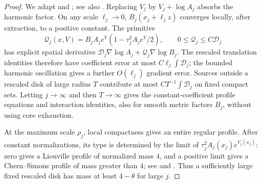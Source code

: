 \documentclass[11pt,reqno]{amsart}
\numberwithin{equation}{section}
\theoremstyle{definition}
\theoremstyle{remark}
\begin{document}
\begin{proof}
We adapt \cite[Lemmas~2.7, 2.9--2.11]{LinYanAIHP} and
\cite[Theorem~3.1]{Choe}; see also \cite[equation~(3.4)]{CKL}.
Replacing $V_j$ by $V_j+\log A_j$ absorbs the harmonic factor.
On any scale $\ell_j\to0$, $B_j(x_j+\ell_jz)$ converges locally,
after extraction, to a positive constant. The primitive
\[
 \mathcal Q_j(x,V)=B_jA_je^V(1-\tau_j^2A_je^V/2),
 \qquad 0\le\mathcal Q_j\le C\mathcal D_j
\]
has explicit spatial derivative
$\mathcal D_j\nabla\log A_j+\mathcal Q_j\nabla\log B_j$.
The rescaled translation identities therefore have coefficient error
at most $C\ell_j\int\mathcal D_j$; the bounded harmonic oscillation
gives a further $O(\ell_j)$ gradient error. Sources outside a rescaled
disk of large radius $T$ contribute at most
$CT^{-1}\int\mathcal D_j$ on fixed compact sets.
Letting $j\to\infty$ and then $T\to\infty$ gives the constant-coefficient
profile equations and interaction identities, also for smooth metric
factors $B_j$, without using core exhaustion.

At the maximum scale $\rho_j$, local compactness gives an entire
regular profile. After constant normalizations, its type is determined
by the limit of $\tau_j^2A_j(x_j)e^{V_j(x_j)}$: zero gives a Liouville
profile of normalized mass $4$, and a positive limit gives a
Chern--Simons profile of mass greater than $4$;
see \cite[pp.~840--841]{CKL} and \cite[Lemmas~2.5--2.6]{LinYanAIHP}.
Thus a sufficiently large fixed rescaled disk has mass at least
$4-\theta$ for large $j$.


\end{proof}
\end{document}
